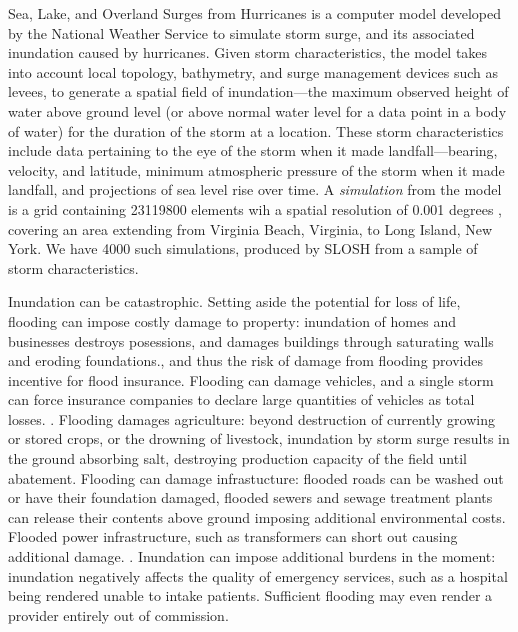 Sea, Lake, and Overland Surges from Hurricanes \citep{jelesnianski1992} is a computer model developed by the National Weather Service to simulate storm surge, and its associated inundation caused by hurricanes.   Given storm characteristics, the model takes into account local topology, bathymetry, and surge management devices such as levees, to generate a spatial field of inundation---the maximum observed height of water above ground level (or above normal water level for a data point in a body of water) for the duration of the storm at a location.   These storm characteristics include data pertaining to the eye of the storm when it made landfall---bearing, velocity, and latitude, minimum atmospheric pressure of the storm when it made landfall, and projections of sea level rise over time.  A \emph{simulation} from the model is a grid containing \num{23119800} elements wih a spatial resolution of \num{0.001} degrees , covering an area extending from Virginia Beach, Virginia, to Long Island, New York.  We have \num{4000} such simulations, produced by SLOSH from a sample of storm characteristics.


Inundation can be catastrophic.  Setting aside the potential for loss of life, flooding can impose costly damage to property: inundation of homes and businesses destroys posessions, and damages buildings through saturating walls and eroding foundations., and thus the risk of damage from flooding provides incentive for flood insurance. \needcite  Flooding can damage vehicles, and a single storm can force insurance companies to declare large quantities of vehicles as total losses. \needcite.  Flooding damages agriculture: beyond destruction of currently growing or stored crops, or the drowning of livestock, inundation by storm surge results in the ground absorbing salt, destroying production capacity of the field until abatement. Flooding can damage infrastucture: flooded roads can be washed out or have their foundation damaged, flooded sewers and sewage treatment plants can release their contents above ground imposing additional environmental costs.  Flooded power infrastructure, such as transformers can short out causing additional damage. \citep{hutchings2021}.  Inundation can impose additional burdens in the moment:  inundation negatively affects the quality of emergency services, such as a hospital being rendered unable to intake patients.  Sufficient flooding may even render a provider entirely out of commission. 

